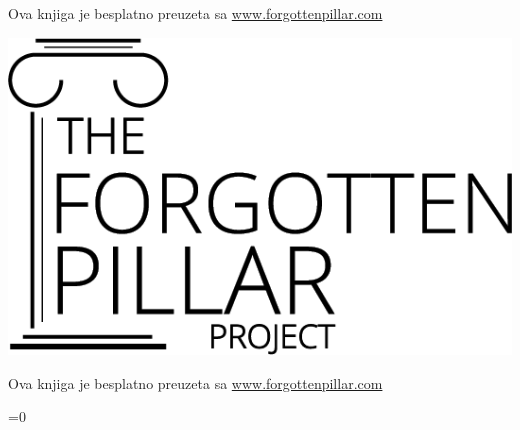 {    Ova knjiga je besplatno preuzeta sa \href{https://forgottenpillar.com/book/the-forgotten-pillar}{www.forgottenpillar.com}
\else
     \noindent
     \begin{minipage}{0.3\textwidth}
         \includegraphics[width=\linewidth]{images/logo-black.png}
     \end{minipage}%
     \hfill
     \begin{minipage}{\dimexpr\linewidth-0.3\textwidth-0.125\textwidth-1em\relax}
         \raggedleft\footnotesize
         Ova knjiga je besplatno preuzeta sa \href{https://forgottenpillar.com/book/the-forgotten-pillar?lang=\currentlang&type=\currentlayout}{www.forgottenpillar.com}
     \end{minipage}%
     \ifnum{}=0
     \else
         \hfill
         \begin{minipage}{0.125\textwidth}
             \centering
         \end{minipage}
     \fi%
\fi
}

\pagebreak